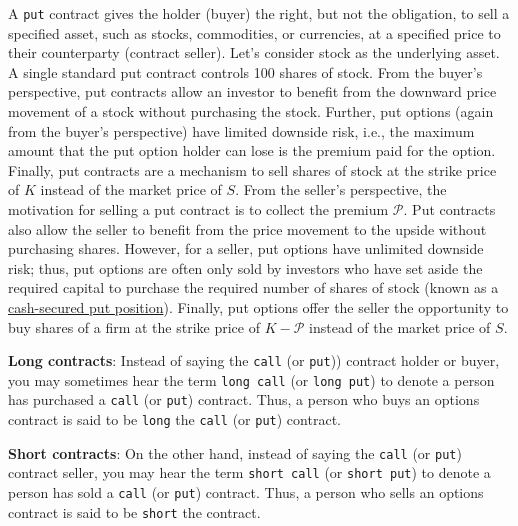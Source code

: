 \documentclass[11pt]{article}
\theoremstyle{definition}
\begin{document}
A \texttt{put} contract gives the holder (buyer) the right, but not the obligation, to sell a specified asset, 
such as stocks, commodities, or currencies, at a specified price to their counterparty (contract seller). 
Let's consider stock as the underlying asset. A single standard put contract controls 100 shares of stock.
From the buyer's perspective, put contracts allow an investor to benefit from the downward price movement of a stock without purchasing the stock. 
Further, put options (again from the buyer's perspective) have limited downside risk, i.e., the maximum amount that the put option holder can lose is the premium paid for the option. 
Finally, put contracts are a mechanism to sell shares of stock at the strike price of $K$ instead of the market price of $S$. 
From the seller's perspective, the motivation for selling a put contract is to collect the premium $\mathcal{P}$. 
Put contracts also allow the seller to benefit from the price movement to the upside without purchasing shares.
However, for a seller, put options have unlimited downside risk; 
thus, put options are often only sold by investors who have set aside the required capital to purchase the required number of shares of stock 
(known as a \href{https://www.fidelity.com/learning-center/investment-products/options/know-about-cash-covered-puts}{cash-secured put position}).
Finally, put options offer the seller the opportunity to buy shares of a firm at the strike price of $K-\mathcal{P}$ instead of the market price of $S$.

\begin{concept}\label{concept:long-short-contracts}

	\textbf{Long contracts}: Instead of saying the \texttt{call} (or \texttt{put})) contract holder or buyer, you may sometimes hear the term \texttt{long call} (or \texttt{long put}) to denote a person has purchased a \texttt{call} (or \texttt{put}) contract.
	Thus, a person who buys an options contract is said to be \texttt{long} the \texttt{call} (or \texttt{put}) contract.
	
	\vspace{0.01in}
	\noindent\textbf{Short contracts}: On the other hand, instead of saying the \texttt{call} (or \texttt{put}) contract seller, you may hear the term \texttt{short call} (or \texttt{short put}) to denote a person has sold a \texttt{call} (or \texttt{put}) contract.
	Thus, a person who sells an options contract is said to be \texttt{short} the contract.
\end{concept}
\end{document}
